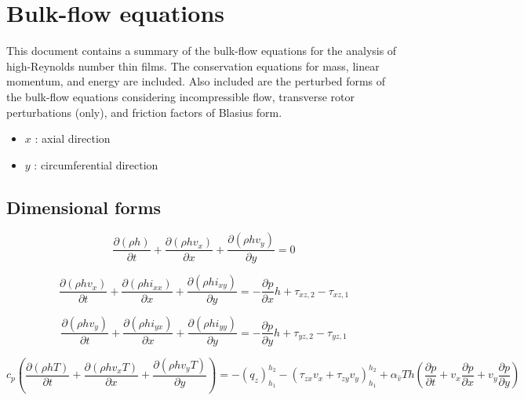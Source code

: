 \documentclass[12pt,letterpaper]{article}
\title{}
\author{}
\begin{document}
\section{Bulk-flow equations}

This document contains a summary of the bulk-flow equations for the
analysis of high-Reynolds number thin films. The conservation equations
for mass, linear momentum, and energy are included. Also included
are the perturbed forms of the bulk-flow equations considering
incompressible flow, transverse rotor perturbations (only),
and friction factors of Blasius form.

\begin{itemize}
 \item $x$ : axial direction
 \item $y$ : circumferential direction
\end{itemize}

\subsection{Dimensional forms}

\begin{dmath}
\frac{\partial \left( \rho h \right)}{\partial t} +
\frac{\partial \left( \rho h v_x \right)}{\partial x} +
\frac{\partial \left( \rho h v_y \right)}{\partial y}
 = 0
\end{dmath}


\begin{dmath}
\frac{\partial \left( \rho h v_x \right)}{\partial t} +
\frac{\partial \left( \rho h i_{xx}\right)}{\partial x} +
\frac{\partial \left( \rho h i_{xy}\right)}{\partial y} =
- \frac{\partial p }{\partial x } h + 
\tau_{xz,2} - \tau_{xz,1}
\end{dmath}

\begin{dmath}
\frac{\partial \left( \rho h v_y \right)}{\partial t} +
\frac{\partial \left( \rho h i_{yx}\right)}{\partial x} +
\frac{\partial \left( \rho h i_{yy}\right)}{\partial y} =
- \frac{\partial p }{\partial y } h + 
\tau_{yz,2} - \tau_{yz,1}
\end{dmath}

\begin{dmath}
c_p \left(
\frac{\partial \left( \rho h T \right) }{\partial t}
+ 
\frac{\partial \left( \rho h v_x T \right) }{\partial x}
+ 
\frac{\partial \left( \rho h v_y T \right) }{\partial y}
\right) = 
- \left( q_z \right)_{h_1}^{h_2} -
 \left(
\tau_{zx}v_x +
\tau_{zy}v_y
\right)_{h_1}^{h_2} +
\alpha_{\hat{v}} T h
\left(
\frac{\partial  p }{\partial t} +
v_x
\frac{\partial  p }{\partial x} +
v_y 
\frac{\partial  p }{\partial y}
\right)
\end{dmath}
\end{document}
